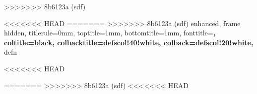 >>>>>>> 8b6123a (sdf)


<<<<<<< HEAD
=======
>>>>>>> 8b6123a (sdf)
{
  enhanced,
  frame hidden,
  titlerule=0mm,
  toptitle=1mm,
  bottomtitle=1mm,
  fonttitle=\bfseries\large,
  coltitle=black,
  colbacktitle=defscol!40!white,
  colback=defscol!20!white,
}{defn}



<<<<<<< HEAD



=======
>>>>>>> 8b6123a (sdf)
<<<<<<< HEAD

